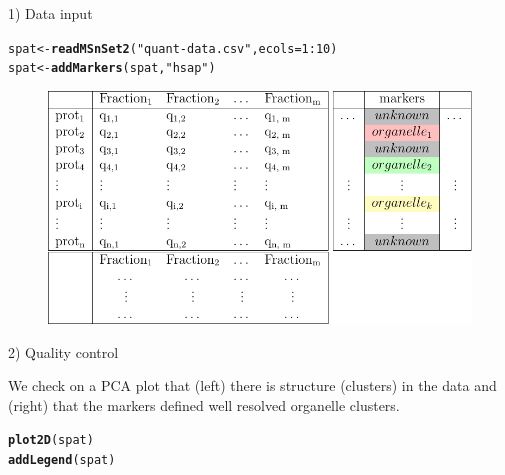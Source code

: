 \documentclass[final]{beamer}\usepackage[]{graphicx}\usepackage[]{color}
\makeatletter
\newcommand{\hlnum}[1]{\textcolor[rgb]{0.686,0.059,0.569}{#1}}%
\newcommand{\hlstr}[1]{\textcolor[rgb]{0.192,0.494,0.8}{#1}}%
\newcommand{\hlopt}[1]{\textcolor[rgb]{0,0,0}{#1}}%
\newcommand{\hlstd}[1]{\textcolor[rgb]{0.345,0.345,0.345}{#1}}%
\newcommand{\hlkwb}[1]{\textcolor[rgb]{0.69,0.353,0.396}{#1}}%
\newcommand{\hlkwc}[1]{\textcolor[rgb]{0.333,0.667,0.333}{#1}}%
\newcommand{\hlkwd}[1]{\textcolor[rgb]{0.737,0.353,0.396}{\textbf{#1}}}%
\newenvironment{kframe}{%
 \def\at@end@of@kframe{}%
 \ifinner\ifhmode%
  \def\at@end@of@kframe{\end{minipage}}%
  \begin{minipage}{\columnwidth}%
 \fi\fi%
 \def\FrameCommand##1{\hskip\@totalleftmargin \hskip-\fboxsep
 \colorbox{shadecolor}{##1}\hskip-\fboxsep
     \hskip-\linewidth \hskip-\@totalleftmargin \hskip\columnwidth}%
 \MakeFramed {\advance\hsize-\width
   \@totalleftmargin\z@ \linewidth\hsize
   \@setminipage}}%
 {\par\unskip\endMakeFramed%
 \at@end@of@kframe}
\newenvironment{knitrout}{}{} %
\makeatother
\begin{document}
\begin{frame}[fragile]
\begin{columns}
\begin{column}{.48\textwidth}
\begin{block}{1) Data input}
\begin{knitrout}
\color{fgcolor}\begin{kframe}
\begin{alltt}
\hlstd{spat} \hlkwb{<-} \hlkwd{readMSnSet2}\hlstd{(}\hlstr{"quant-data.csv"}\hlstd{,} \hlkwc{ecols} \hlstd{=} \hlnum{1}\hlopt{:}\hlnum{10}\hlstd{)}
\hlstd{spat} \hlkwb{<-} \hlkwd{addMarkers}\hlstd{(spat,} \hlstr{"hsap"}\hlstd{)}
\end{alltt}
\end{kframe}
\end{knitrout}
      \end{block}
      \begin{figure}
        \centering
        \includegraphics[width=.75\linewidth]{./figures/Fig1-data-a.pdf}
      \end{figure}
      \bigskip

      \begin{block}{2) Quality control}

        We check on a PCA plot that (left) there is structure
        (clusters) in the data and (right) that the markers defined
        well resolved organelle clusters.

\begin{knitrout}
\color{fgcolor}\begin{kframe}
\begin{alltt}
\hlkwd{plot2D}\hlstd{(spat)}
\hlkwd{addLegend}\hlstd{(spat)}
\end{alltt}
\end{kframe}
\end{knitrout}


\end{block}
\end{column}
\end{columns}
\end{frame}
\end{document}
